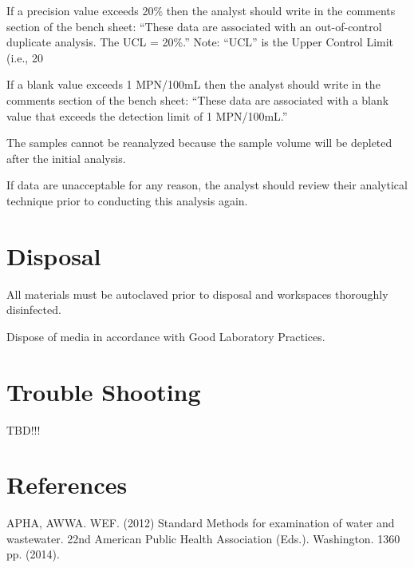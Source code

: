 \documentclass[12pt]{../SOP4_alpha}\usepackage[]{graphicx}\usepackage[]{xcolor}
\begin{document}
\NP If a precision value exceeds 20\% then the analyst should write in the
comments section of the bench sheet: “These data are associated
with an out-of-control duplicate analysis. The UCL = 20\%.” Note:
“UCL” is the Upper Control Limit (i.e., 20%

\NP If a blank value exceeds 1 MPN/100mL then the analyst should write
in the comments section of the bench sheet: “These data are
associated with a blank value that exceeds the detection limit of 1
MPN/100mL.”

\NP The samples cannot be reanalyzed because the sample volume will be
depleted after the initial analysis.

\NP  If data are unacceptable for any reason, the analyst should review
their analytical technique prior to conducting this analysis again. 

\section{Disposal}

\NP All materials must be autoclaved prior to disposal and workspaces
thoroughly disinfected.

\NP Dispose of media in accordance with Good Laboratory Practices.

\section{Trouble Shooting}

TBD!!! 


\section{References}

\NP APHA, AWWA. WEF. (2012) Standard Methods for examination of water and wastewater. 22nd American Public Health Association (Eds.). Washington. 1360 pp. (2014).
\end{document}
